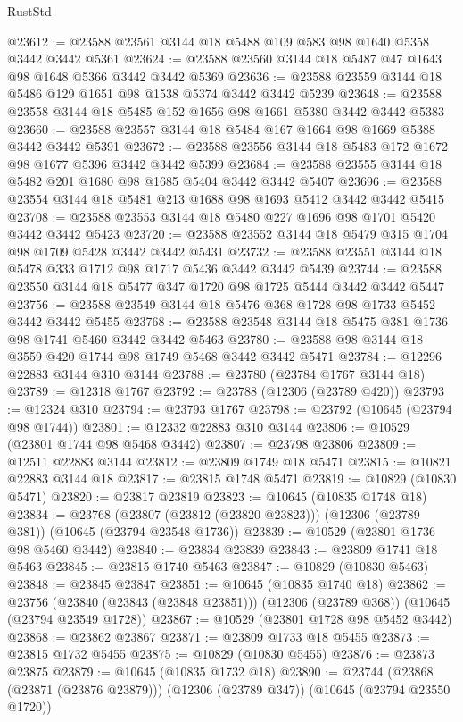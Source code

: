\begin{lexlean}{RustStd}
\begin{coremodule}
@23612 := @23588 @23561 @3144 @18 @5488 @109 @583 @98 @1640 @5358 @3442 @3442 @5361
@23624 := @23588 @23560 @3144 @18 @5487 @47 @1643 @98 @1648 @5366 @3442 @3442 @5369
@23636 := @23588 @23559 @3144 @18 @5486 @129 @1651 @98 @1538 @5374 @3442 @3442 @5239
@23648 := @23588 @23558 @3144 @18 @5485 @152 @1656 @98 @1661 @5380 @3442 @3442 @5383
@23660 := @23588 @23557 @3144 @18 @5484 @167 @1664 @98 @1669 @5388 @3442 @3442 @5391
@23672 := @23588 @23556 @3144 @18 @5483 @172 @1672 @98 @1677 @5396 @3442 @3442 @5399
@23684 := @23588 @23555 @3144 @18 @5482 @201 @1680 @98 @1685 @5404 @3442 @3442 @5407
@23696 := @23588 @23554 @3144 @18 @5481 @213 @1688 @98 @1693 @5412 @3442 @3442 @5415
@23708 := @23588 @23553 @3144 @18 @5480 @227 @1696 @98 @1701 @5420 @3442 @3442 @5423
@23720 := @23588 @23552 @3144 @18 @5479 @315 @1704 @98 @1709 @5428 @3442 @3442 @5431
@23732 := @23588 @23551 @3144 @18 @5478 @333 @1712 @98 @1717 @5436 @3442 @3442 @5439
@23744 := @23588 @23550 @3144 @18 @5477 @347 @1720 @98 @1725 @5444 @3442 @3442 @5447
@23756 := @23588 @23549 @3144 @18 @5476 @368 @1728 @98 @1733 @5452 @3442 @3442 @5455
@23768 := @23588 @23548 @3144 @18 @5475 @381 @1736 @98 @1741 @5460 @3442 @3442 @5463
@23780 := @23588 @98 @3144 @18 @3559 @420 @1744 @98 @1749 @5468 @3442 @3442 @5471
@23784 := @12296 @22883 @3144 @310 @3144
@23788 := @23780 (@23784 @1767 @3144 @18)
@23789 := @12318 @1767
@23792 := @23788 (@12306 (@23789 @420))
@23793 := @12324 @310
@23794 := @23793 @1767
@23798 := @23792 (@10645 (@23794 @98 @1744))
@23801 := @12332 @22883 @310 @3144
@23806 := @10529 (@23801 @1744 @98 @5468 @3442)
@23807 := @23798 @23806
@23809 := @12511 @22883 @3144
@23812 := @23809 @1749 @18 @5471
@23815 := @10821 @22883 @3144 @18
@23817 := @23815 @1748 @5471
@23819 := @10829 (@10830 @5471)
@23820 := @23817 @23819
@23823 := @10645 (@10835 @1748 @18)
@23834 := @23768
    (@23807 (@23812 (@23820 @23823)))
    (@12306 (@23789 @381))
    (@10645 (@23794 @23548 @1736))
@23839 := @10529 (@23801 @1736 @98 @5460 @3442)
@23840 := @23834 @23839
@23843 := @23809 @1741 @18 @5463
@23845 := @23815 @1740 @5463
@23847 := @10829 (@10830 @5463)
@23848 := @23845 @23847
@23851 := @10645 (@10835 @1740 @18)
@23862 := @23756
    (@23840 (@23843 (@23848 @23851)))
    (@12306 (@23789 @368))
    (@10645 (@23794 @23549 @1728))
@23867 := @10529 (@23801 @1728 @98 @5452 @3442)
@23868 := @23862 @23867
@23871 := @23809 @1733 @18 @5455
@23873 := @23815 @1732 @5455
@23875 := @10829 (@10830 @5455)
@23876 := @23873 @23875
@23879 := @10645 (@10835 @1732 @18)
@23890 := @23744
    (@23868 (@23871 (@23876 @23879)))
    (@12306 (@23789 @347))
    (@10645 (@23794 @23550 @1720))

\end{coremodule}
\end{lexlean}
